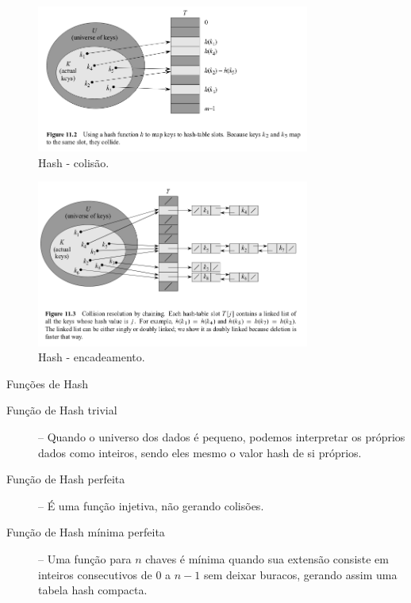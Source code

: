 \begin{frame}
  \begin{figure}[h!]
  \centering
  \includegraphics[width=0.8\textwidth,height=0.7\textheight,keepaspectratio]{figures/hash-fig112.png}
  \caption{Hash - colisão.}
  \label{fig:hash-fig112}
  \end{figure}

\framebreak

  \begin{figure}[h!]
  \centering
  \includegraphics[width=0.8\textwidth,height=0.7\textheight,keepaspectratio]{figures/hash-fig113.png}
  \caption{Hash - encadeamento.}
  \label{fig:hash-fig113}
  \end{figure}

\framebreak

Funções de Hash
\begin{description}
\item[Função de Hash trivial] -- Quando o universo dos dados é pequeno, podemos interpretar os próprios dados como inteiros, sendo
eles mesmo o valor hash de si próprios.
\item[Função de Hash perfeita] -- É uma função injetiva, não gerando colisões.
\item[Função de Hash mínima perfeita] -- Uma função para $n$ chaves é mínima quando sua extensão consiste em inteiros consecutivos de $0$ a $n-1$
sem deixar buracos, gerando assim uma tabela hash compacta.
\end{description}


\end{frame}
